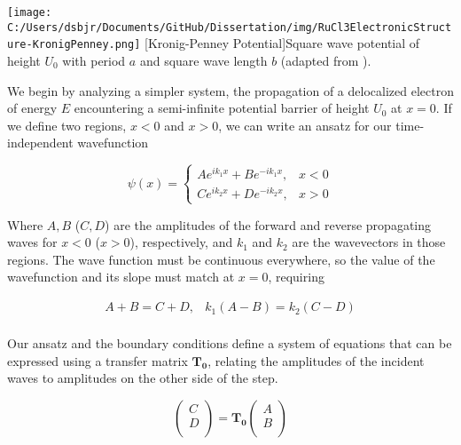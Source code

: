 \begin{centering}
\texttt{[image: C:/Users/dsbjr/Documents/GitHub/Dissertation/img/RuCl3ElectronicStructure-KronigPenney.png]}
  \captionsetup{width=0.75\textwidth}
  [Kronig-Penney Potential]{Square wave potential of height $U_{0}$ with period $a$ and square wave length $b$ (adapted from \cite{Erez2014}).} 
  \label{fig:RuCl3ElecStruct-1}
\end{centering}

We begin by analyzing a simpler system, the propagation of a delocalized electron of energy $E$ encountering a semi-infinite potential barrier of height $U_{0}$ at $x = 0$. If we define two regions, $x <0$ and $x>0$, we can write an ansatz for our time-independent wavefunction

\begin{equation}
\psi(x) =
	\begin{cases}
	A e^{i k_{1} x} + B e^{-i k_{1} x}, & x < 0 \\
	C e^{i k_{2} x} + D e^{-i k_{2} x}, & x > 0
	\end{cases}
\end{equation}
	
Where $A,B$ ($C,D$) are the amplitudes of the forward and reverse propagating waves for $x<0$ ($x>0$), respectively, and $k_{1}$ and $k_{2}$ are the wavevectors in those regions. The wave function must be continuous everywhere, so the value of the wavefunction and its slope must match at $x = 0$, requiring

\begin{equation}
	\begin{array}{cc}
		A + B = C + D, & k_{1}(A - B) = k_{2}(C - D) \\
	\end{array}
\end{equation}

Our ansatz and the boundary conditions define a system of equations that can be expressed using a transfer matrix $\mathbf{T_{0}}$, relating the amplitudes of the incident waves to amplitudes on the other side of the step.

\begin{equation}
	\begin{pmatrix}
		C \\
		D \\
	\end{pmatrix} =
	\mathbf{T_{0}}
	\begin{pmatrix}
		A \\
		B \\
	\end{pmatrix}
\end{equation}


